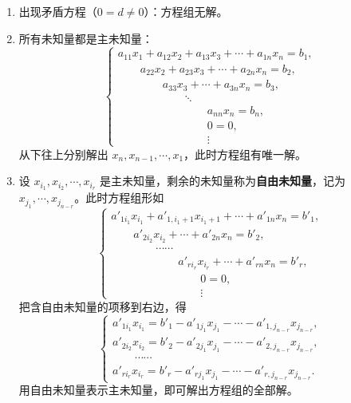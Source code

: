 \documentclass[UTF8,11pt]{ctexart}
\theoremstyle{cnthm}
\begin{document}
\begin{enumerate}
\item 出现矛盾方程（$0=d\neq0$）：方程组无解。

\item 所有未知量都是主未知量：
\[
\begin{cases}
a_{11}x_1 + a_{12}x_2 + a_{13}x_3 + \cdots + a_{1n}x_n = b_1,\\
\qquad a_{22}x_2 + a_{23}x_3 + \cdots + a_{2n}x_n = b_2,\\
\qquad\qquad a_{33}x_3 + \cdots + a_{3n}x_n = b_3,\\
\qquad\qquad\qquad \ddots\\
\qquad\qquad\qquad\qquad a_{nn}x_n = b_n,\\
\qquad\qquad\qquad\qquad 0 = 0,\\
\qquad\qquad\qquad\qquad \vdots
\end{cases}
\]
从下往上分别解出 $x_n,x_{n-1},\cdots,x_1$，此时方程组有唯一解。

\item 设 $x_{i_1},x_{i_2},\cdots,x_{i_r}$ 是主未知量，剩余的未知量称为\textbf{自由未知量}，记为 $x_{j_1},\cdots,x_{j_{n-r}}$。此时方程组形如
\[
\begin{cases}
a'_{1i_1}x_{i_1} + a'_{1,i_1+1}x_{i_1+1} + \cdots + a'_{1n}x_n = b'_1,\\
\qquad a'_{2i_2}x_{i_2} + \cdots + a'_{2n}x_n = b'_2,\\
\qquad\qquad \cdots\cdots\\
\qquad\qquad\qquad a'_{ri_r}x_{i_r} + \cdots + a'_{rn}x_n = b'_r,\\
\qquad\qquad\qquad\qquad 0 = 0,\\
\qquad\qquad\qquad\qquad \vdots
\end{cases}
\]
把含自由未知量的项移到右边，得
\[
\begin{cases}
a'_{1i_1}x_{i_1} = b'_1 - a'_{1j_1}x_{j_1} - \cdots - a'_{1,j_{n-r}}x_{j_{n-r}},\\
a'_{2i_2}x_{i_2} = b'_2 - a'_{2j_1}x_{j_1} - \cdots - a'_{2,j_{n-r}}x_{j_{n-r}},\\
\qquad\cdots\cdots\\
a'_{ri_r}x_{i_r} = b'_r - a'_{rj_1}x_{j_1} - \cdots - a'_{r,j_{n-r}}x_{j_{n-r}}.
\end{cases}
\]
用自由未知量表示主未知量，即可解出方程组的全部解。
\end{enumerate}
\end{document}
